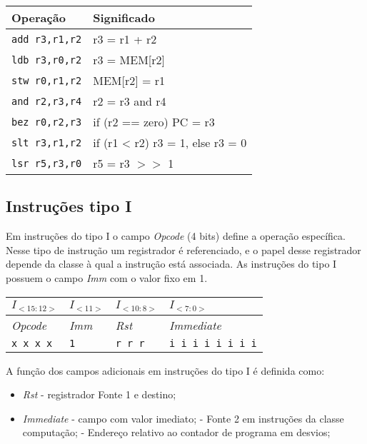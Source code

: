 \documentclass{extreport}
\begin{document}
\begin{table}[ht!]
\centering
\begin{tabular}{|p{3.0cm}|p{6.0cm}|}
\hline
\bf{Operação} & \bf{Significado} \\ \hline \hline
\texttt{add r3,r1,r2} & r3 = r1 + r2 \\ \hline
\texttt{ldb r3,r0,r2} & r3 = MEM[r2] \\ \hline
\texttt{stw r0,r1,r2} & MEM[r2] = r1 \\ \hline
\texttt{and r2,r3,r4} & r2 = r3 and r4 \\ \hline
\texttt{bez r0,r2,r3} & if (r2 == zero) PC = r3 \\ \hline
\texttt{slt r3,r1,r2} & if (r1 < r2) r3 = 1, else r3 = 0 \\ \hline
\texttt{lsr r5,r3,r0} & r5 = r3 $>>$ 1 \\ \hline
\end{tabular}
\end{table}

\subsection{Instruções tipo I}
Em instruções do tipo I o campo \textit{Opcode} (4 bits) define a operação específica. Nesse tipo de instrução um registrador é referenciado, e o papel desse registrador depende da classe à qual a instrução está associada. As instruções do tipo I possuem o campo \textit{Imm} com o valor fixo em 1.

\begin{table}[ht!]
\centering
\begin{tabular}{|p{1.6cm}|p{1.6cm}|p{1.6cm}|p{5.65cm}|}
\hline
$I_{<15:12>}$ & $I_{<11>}$ & $I_{<10:8>}$ & $I_{<7:0>}$ \\ \hline
\textit{Opcode} & \textit{Imm} & \textit{Rst} & \textit{Immediate} \\ \hline
\texttt{x x x x} & \texttt{1} & \texttt{r r r} & \texttt{i i i i i i i i} \\ \hline
\end{tabular}
\end{table}

A função dos campos adicionais em instruções do tipo I é definida como:

\begin{itemize}
\item \textit{Rst} - registrador Fonte 1 e destino;
\item \textit{Immediate} - campo com valor imediato;
\subitem - Fonte 2 em instruções da classe computação;
\subitem - Endereço relativo ao contador de programa em desvios;
\end{itemize}
\end{document}
